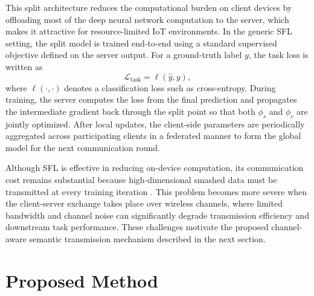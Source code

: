 This split architecture reduces the computational burden on client devices by offloading most of the deep neural network computation to the server, which makes it attractive for resource-limited IoT environments. In the generic SFL setting, the split model is trained end-to-end using a standard supervised objective defined on the server output. For a ground-truth label $y$, the task loss is written as
\begin{equation}
\mathcal{L}_{\mathrm{task}} = \ell(\hat{y}, y),
\end{equation}
where $\ell(\cdot,\cdot)$ denotes a classification loss such as cross-entropy. During training, the server computes the loss from the final prediction and propagates the intermediate gradient back through the split point so that both $\phi_s$ and $\phi_c$ are jointly optimized. After local updates, the client-side parameters are periodically aggregated across participating clients in a federated manner to form the global model for the next communication round.

Although SFL is effective in reducing on-device computation, its communication cost remains substantial because high-dimensional smashed data must be transmitted at every training iteration \cite{gao2020end}. This problem becomes more severe when the client-server exchange takes place over wireless channels, where limited bandwidth and channel noise can significantly degrade transmission efficiency and downstream task performance. These challenges motivate the proposed channel-aware semantic transmission mechanism described in the next section.

\section{Proposed Method}

